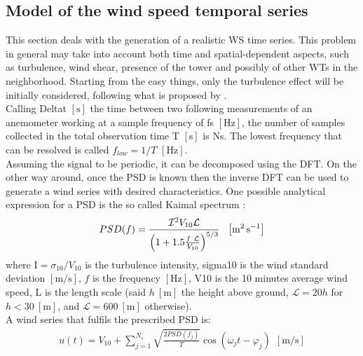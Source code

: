 \subsection[Wind speed temporal series]{Model of the wind speed temporal series}
This section deals with the generation of a realistic \acrshort{WS} time series. This problem in general may take into account both time and spatial-dependent aspects, such as turbulence, wind shear, presence of the tower and possibly of other WTs in the neighborhood. Starting from the easy things, only the turbulence effect will be initially considered, following what is proposed by \cite{Aerodynamics_of_wind_turbines}. \\
Calling \acrshort{Deltat} $\left[\si{\second}\right]$ the time between two following measurements of an anemometer working at a sample frequency of \acrshort{fs} $\left[\si{\hertz}\right]$, the number of samples collected in the total observation time \acrshort{T} $\left[\si{\second}\right]$ is \acrshort{Ns}. The lowest frequency that can be resolved is called $f_{low}=1/T$ $\left[\si{\hertz}\right]$. \\
Assuming the signal to be periodic, it can be decomposed using the \acrfull{DFT}. On the other way around, once the \acrfull{PSD} is known then the inverse \acrshort{DFT} can be used to generate a wind series with desired characteristics. One possible analytical expression for a \acrshort{PSD} is the so called Kaimal spectrum \cite{Aerodynamics_of_wind_turbines}:
\begin{equation}
    PSD(f) = \frac{\mathcal{I} ^2V_{10}\mathcal{L} }{\left(1+1.5\frac{f \ \mathcal{L} }{V_{10}}\right)^{5/3}} \ \ \mesunt{\square \meter \per \second}
    \label{eq:PSD}
\end{equation}
where \acrshort{I}$=\sigma_{10}/V_{10}$ is the turbulence intensity, \acrshort{sigma10} is the wind standard deviation $\left[\si{\meter\per\second}\right]$, $f$ is the frequency $\left[\si{\hertz}\right]$, \acrshort{V10} is the 10 minutes average wind speed, \acrshort{L} is the length scale (said $h \ \left[\si{\meter}\right]$ the height above ground, $\mathcal{L}=20h$ for $h<30 \ \left[\si{\meter}\right]$, and  $\mathcal{L}=600 \ \left[\si{\meter}\right]$ otherwise).\\
A wind series that fulfils the prescribed \acrshort{PSD} is:
\begin{gather}
    u(t) = V_{10}+\sum_{j=1}^{N_s}\sqrt{\frac{2PSD(f_j)}{T}}\cos{(\omega_jt-\varphi_j)} \ \ \left[\si{\meter \per \second}\right]
    \label{eq:wind_series}
\end{gather}
